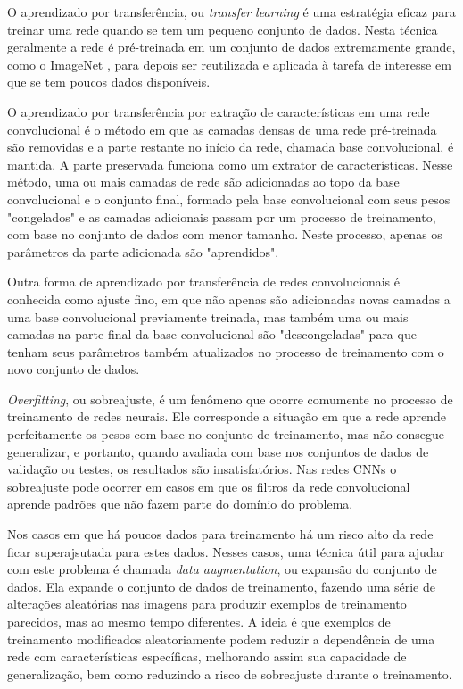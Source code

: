 O aprendizado por transferência, ou \textit{transfer learning} é uma estratégia eficaz para treinar uma rede quando se tem um pequeno conjunto de dados. Nesta técnica geralmente a rede é pré-treinada em um conjunto de dados extremamente grande, como o ImageNet \cite{Russakovsky2014}, para depois ser reutilizada e aplicada à tarefa de interesse em que se tem poucos dados disponíveis. 

O aprendizado por transferência por extração de características em uma rede convolucional é o método em que as camadas densas de uma rede pré-treinada são removidas e a parte restante no início da rede, chamada base convolucional, é mantida. A parte preservada funciona como um extrator de características. Nesse método, uma ou mais camadas de rede são adicionadas ao topo da base convolucional e o conjunto final, formado pela base convolucional com seus pesos "congelados" e as camadas adicionais passam por um processo de treinamento, com base no conjunto de dados com menor tamanho. Neste processo, apenas os parâmetros da parte adicionada são "aprendidos".

Outra forma de aprendizado por transferência de redes convolucionais é conhecida como ajuste fino, em que não apenas são adicionadas novas camadas a uma base convolucional previamente treinada, mas também uma ou mais camadas na parte final da base convolucional são "descongeladas" para que tenham seus parâmetros também atualizados no processo de treinamento com o novo conjunto de dados.

\textit{Overfitting}, ou sobreajuste, é um fenômeno que ocorre comumente no processo de treinamento de redes neurais. Ele corresponde a situação em que a rede aprende perfeitamente os pesos com base no conjunto de treinamento, mas não consegue generalizar, e portanto, quando avaliada com base nos conjuntos de dados de validação ou testes, os resultados são insatisfatórios. Nas redes CNNs o sobreajuste pode ocorrer em casos em que os filtros da rede convolucional aprende padrões que não fazem parte do domínio do problema.

Nos casos em que há poucos dados para treinamento há um risco alto da rede ficar superajsutada para estes dados. Nesses casos, uma técnica útil para ajudar com este problema é chamada \textit{data augmentation}, ou expansão do conjunto de dados. Ela expande o conjunto de dados de treinamento, fazendo uma série de alterações aleatórias nas imagens para produzir exemplos de treinamento parecidos, mas ao mesmo tempo diferentes. A ideia é que exemplos de treinamento modificados aleatoriamente podem reduzir a dependência de uma rede com características específicas, melhorando assim sua capacidade de generalização, bem como reduzindo a risco de sobreajuste durante o treinamento. 

